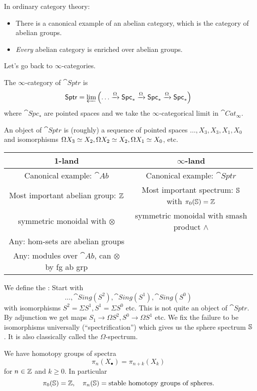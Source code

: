 In ordinary category theory:
\begin{itemize}
	\item There is a canonical example of an abelian category, which is the category of abelian groups.
	\item \emph{Every} abelian category is enriched over abelian groups.
\end{itemize}
Let's go back to $\infty$-categories.
\begin{definition}
	The $\infty$-category of  $\cat{Sptr}$ is
	\[
		\cat{Sptr} = \varprojlim \left( \dots\xrightarrow{\Omega} \cat{Spc}_* \xrightarrow{\Omega} \cat{Spc}_*\xrightarrow{\Omega} \cat{Spc}_* \right) 
	\] 
	where $\cat{Spc}_*$ are pointed spaces and we take the $\infty$-categorical limit in $\cat{Cat}_\infty$.
\end{definition}
An object of $\cat{Sptr}$ is (roughly) a sequence of pointed spaces $\dots,X_3,X_3,X_1,X_0$ and isomorphisms $\Omega X_3\isoto X_2, \Omega X_2\isoto X_2, \Omega X_1\isoto X_0$, etc.

\begin{table}[h]
	\centering
	\begin{tabular}{c|c}
	1-land & $\infty$-land \\ \hline
	Canonical example: $\cat{Ab}$ & Canonical example: $\cat{Sptr}$ \\
	Most important abelian group: $\Z$ & Most important spectrum: $\S$ with $\pi_0(\S)=\Z$ \\
	symmetric monoidal with $\otimes$ & symmetric monoidal with smash product $\wedge$ \\
	Any: hom-sets are abelian groups & \\
	Any: modules over $\cat{Ab}$, can $\otimes$ by fg ab grp
	\end{tabular}
\end{table}

We define the : Start with
\[
	\dots, \cat{Sing}(S^2), \cat{Sing}(S^{1}), \cat{Sing}(S^{0})
\] 
with isomorphisms $S^2=\Sigma S^{1}, S^{1}=\Sigma S^{0}$ etc. This is not quite an object of $\cat{Sptr}$. By adjunction we get maps $S_1\to \Omega S^2, S^0\to \Omega S^{1}$ etc. We fix the failure to be isomorphisms universally (``spectrification'') which gives us the sphere spectrum $\S$. It is also classically called the $\Omega$-spectrum.

We have homotopy groups of spectra
\[
\pi_n (X_\bullet) = \pi_{n+k}(X_k)
\] 
for $n\in \Z$ and $k\ge 0$. In particular
\[
\pi_0(\S) = \Z,\quad \pi_n(\S) = \text{stable homotopy groups of spheres}.
\] 


